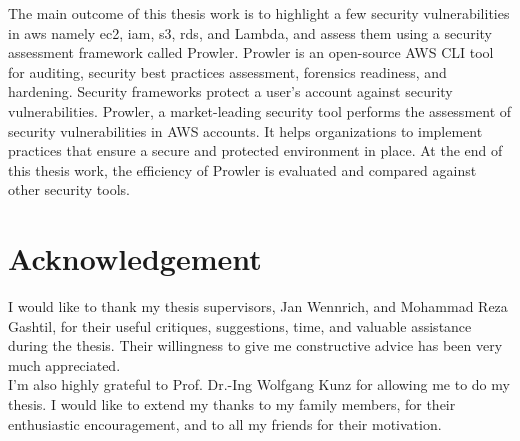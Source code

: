 \documentclass[a4paper,11pt]{report}
\newcommand\blankpage{%
    \null
    \thispagestyle{empty}%
    \addtocounter{page}{-1}%
    \newpage}
\begin{document}
\hfill \break
The main outcome of this thesis work is to highlight a
few security vulnerabilities in \gls{aws} namely
\gls{ec2}, \gls{iam},
\gls{s3}, \gls{rds}, and Lambda, and assess them using a
security assessment framework called Prowler.
Prowler is an open-source AWS CLI tool for auditing, security best practices assessment, forensics readiness, and hardening.
Security frameworks protect a user’s account against security vulnerabilities.
Prowler, a market-leading security tool performs the assessment of security vulnerabilities in AWS accounts.
It helps organizations to implement practices that ensure a secure and protected environment in place.
At the end of this thesis work, the efficiency of Prowler is evaluated and compared against other security tools.

\afterpage{\blankpage}
\cleardoublepage

\section*{Acknowledgement}
\text I would like to thank my thesis supervisors, Jan Wennrich, and Mohammad Reza Gashtil, for their useful critiques, suggestions, time, and valuable assistance during the thesis.
Their willingness to give me constructive advice has been very much appreciated.
\\
I’m also highly grateful to Prof.
Dr.-Ing Wolfgang Kunz for allowing me to do my thesis.
I would like to extend my thanks to my family members,
for their enthusiastic encouragement, and to all my
friends for their motivation.

\afterpage{\blankpage}
\cleardoublepage

\tableofcontents










\clearpage
{}
\listoffigures
\pagebreak
{}
\listoftables
\pagebreak
{}
\lstlistoflistings
{}
\glsaddall
\pagebreak
\printnoidxglossary[type=\acronymtype,style=long,
    title=List of Abbreviations,nonumberlist]


\end{document}
